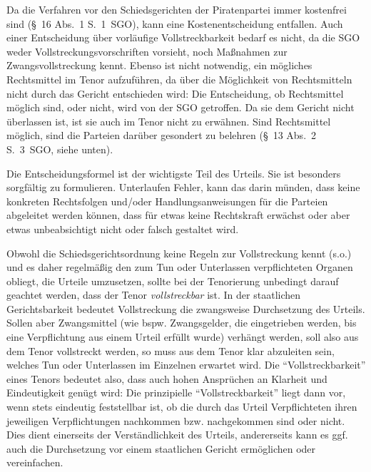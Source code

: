 Da die Verfahren vor den Schiedsgerichten der Piratenpartei immer kostenfrei sind (\S~16 Abs.~1 S.~1~SGO), kann eine Kostenentscheidung entfallen.
Auch einer Entscheidung über vorläufige Vollstreckbarkeit bedarf es nicht, da die SGO weder Vollstreckungsvorschriften vorsieht, noch Maßnahmen zur Zwangsvollstreckung kennt.
Ebenso ist nicht notwendig, ein mögliches Rechtsmittel im Tenor aufzuführen, da über die Möglichkeit von Rechtsmitteln nicht durch das Gericht entschieden wird:
Die Entscheidung, ob Rechtsmittel möglich sind, oder nicht, wird von der SGO getroffen.
Da sie dem Gericht nicht überlassen ist, ist sie auch im Tenor nicht zu erwähnen.
Sind Rechtsmittel möglich, sind die Parteien darüber gesondert zu belehren (\S~13 Abs.~2 S.~3~SGO, siehe unten).

Die Entscheidungsformel ist der wichtigste Teil des Urteils.
Sie ist besonders sorgfältig zu formulieren.
Unterlaufen Fehler, kann das darin münden, dass keine konkreten Rechtsfolgen und/oder Handlungsanweisungen für die Parteien abgeleitet werden können, dass für etwas keine Rechtskraft erwächst oder aber etwas unbeabsichtigt nicht oder falsch gestaltet wird.

Obwohl die Schiedsgerichtsordnung keine Regeln zur Vollstreckung kennt (s.o.) und es daher regelmäßig den zum Tun oder Unterlassen verpflichteten Organen obliegt, die Urteile umzusetzen, sollte bei der Tenorierung unbedingt darauf geachtet werden, dass der Tenor \emph{vollstreckbar} ist.
In der staatlichen Gerichtsbarkeit bedeutet Vollstreckung die zwangsweise Durchsetzung des Urteils.
Sollen aber Zwangsmittel (wie bspw. Zwangsgelder, die eingetrieben werden, bis eine Verpflichtung aus einem Urteil erfüllt wurde) verhängt werden, soll also aus dem Tenor vollstreckt werden, so muss aus dem Tenor klar abzuleiten sein, welches Tun oder Unterlassen im Einzelnen erwartet wird.
Die \enquote{Vollstreckbarkeit} eines Tenors bedeutet also, dass auch hohen Ansprüchen an Klarheit und Eindeutigkeit genügt wird:
Die prinzipielle \enquote{Vollstreckbarkeit} liegt dann vor, wenn stets eindeutig feststellbar ist, ob die durch das Urteil Verpflichteten ihren jeweiligen Verpflichtungen nachkommen bzw. nachgekommen sind oder nicht.
Dies dient einerseits der Verständlichkeit des Urteils, andererseits kann es ggf. auch die Durchsetzung vor einem staatlichen Gericht ermöglichen oder vereinfachen.

